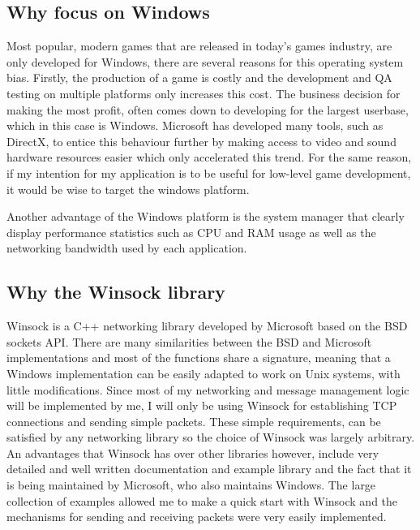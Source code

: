 \subsection{Why focus on Windows}
Most popular, modern games that are released in today's games industry, are only developed for Windows, there are several reasons for this operating system bias. Firstly, the production of a game is costly and the development and QA testing on multiple platforms only increases this cost. The business decision for making the most profit, often comes down to developing for the largest userbase, which in this case is Windows. Microsoft has developed many tools, such as DirectX, to entice this behaviour further by making access to video and sound hardware resources easier which only accelerated this trend.
For the same reason, if my intention for my application is to be useful for low-level game development, it would be wise to target the windows platform.

Another advantage of the Windows platform is the system manager that clearly display performance statistics such as CPU and RAM usage as well as the networking bandwidth used by each application.


\subsection{Why the Winsock library}
Winsock is a C++ networking library developed by Microsoft based on the BSD sockets API. There are many similarities between the BSD and Microsoft implementations and most of the functions share a signature, meaning that a Windows implementation can be easily adapted to work on Unix systems, with little modifications. Since most of my networking and message management logic will be implemented by me, I will only be using Winsock for establishing TCP connections and sending simple packets. These simple requirements, can be satisfied by any networking library so the choice of Winsock was largely arbitrary. An advantages that Winsock has over other libraries however, include very detailed and well written documentation and example library and the fact that it is being maintained by Microsoft, who also maintains Windows. The large collection of examples allowed me to make a quick start with Winsock and the mechanisms for sending and receiving packets were very easily implemented.


\newpage
